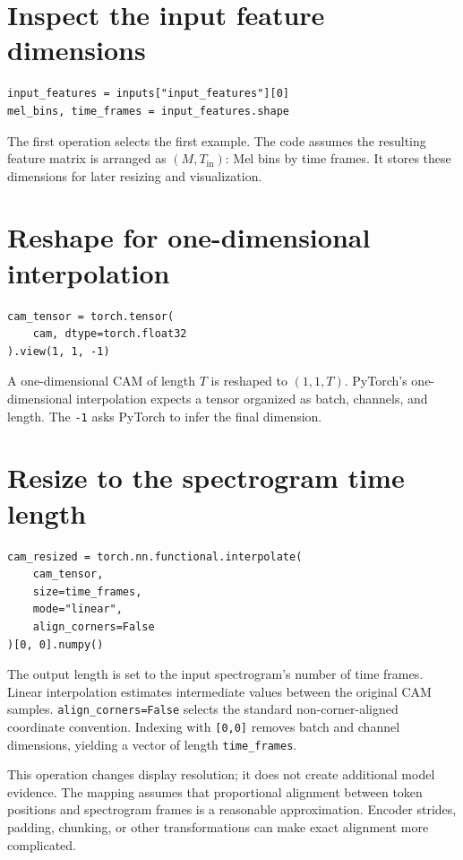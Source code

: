 \documentclass[11pt,a4paper]{article}
\begin{document}
\section{Inspect the input feature dimensions}
\begin{lstlisting}[style=python]
input_features = inputs["input_features"][0]
mel_bins, time_frames = input_features.shape
\end{lstlisting}
The first operation selects the first example. The code assumes the resulting feature matrix is arranged as $(M,T_{\mathrm{in}})$: Mel bins by time frames. It stores these dimensions for later resizing and visualization.

\section{Reshape for one-dimensional interpolation}
\begin{lstlisting}[style=python]
cam_tensor = torch.tensor(
    cam, dtype=torch.float32
).view(1, 1, -1)
\end{lstlisting}
A one-dimensional CAM of length $T$ is reshaped to $(1,1,T)$. PyTorch's one-dimensional interpolation expects a tensor organized as batch, channels, and length. The \texttt{-1} asks PyTorch to infer the final dimension.

\section{Resize to the spectrogram time length}
\begin{lstlisting}[style=python]
cam_resized = torch.nn.functional.interpolate(
    cam_tensor,
    size=time_frames,
    mode="linear",
    align_corners=False
)[0, 0].numpy()
\end{lstlisting}
The output length is set to the input spectrogram's number of time frames. Linear interpolation estimates intermediate values between the original CAM samples. \texttt{align\_corners=False} selects the standard non-corner-aligned coordinate convention. Indexing with \texttt{[0,0]} removes batch and channel dimensions, yielding a vector of length \texttt{time\_frames}.

This operation changes display resolution; it does not create additional model evidence. The mapping assumes that proportional alignment between token positions and spectrogram frames is a reasonable approximation. Encoder strides, padding, chunking, or other transformations can make exact alignment more complicated.
\end{document}
